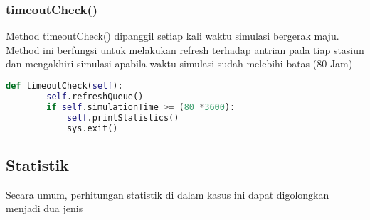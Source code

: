 \documentclass{article}
\begin{document}
\subsubsection{timeoutCheck()}
Method timeoutCheck() dipanggil setiap kali waktu simulasi bergerak maju. Method ini berfungsi untuk melakukan refresh terhadap antrian pada tiap stasiun dan mengakhiri simulasi apabila waktu simulasi sudah melebihi batas (80 Jam)
\begin{lstlisting}[language=Python]
def timeoutCheck(self):
		self.refreshQueue()
		if self.simulationTime >= (80 *3600):
			self.printStatistics()
			sys.exit()
\end{lstlisting}

\pagebreak
\subsection{Statistik}
Secara umum, perhitungan statistik di dalam kasus ini dapat digolongkan menjadi dua jenis
\end{document}

